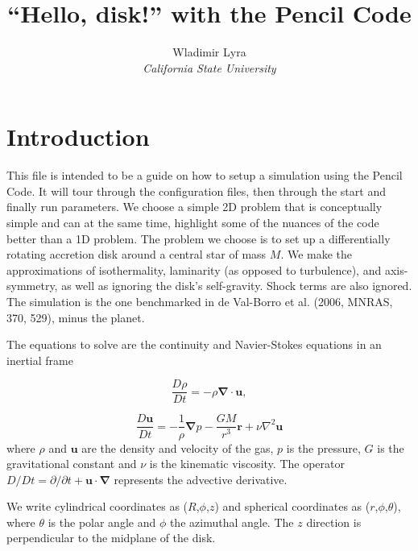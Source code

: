 \documentclass[a4paper,10pt]{article}
\newcommand{\pencilcode}{{\sc Pencil Code}}
\newcommand{\aderiv}[1]{\frac{D #1}{Dt}}
\renewcommand{\v}[1]{{\boldsymbol #1}} %
\newcommand{\del}{\v{\nabla}}
\newcommand{\grad}{\del}
\newcommand{\Div}{\v{\nabla}\cdot}
\newcommand{\Laplace}{\nabla^2}
\begin{document}
\date{}


\title{{\bf ``Hello, disk!'' with the \pencilcode}}


\author{Wladimir Lyra\\
{\it California State University}}               
\date{}  

\maketitle


\section{Introduction}

This file is intended to be a guide on how to setup a simulation using
the \pencilcode. It will tour through the configuration files, then
through the start and finally run parameters. We choose a simple 2D
problem that is conceptually simple and can at the same time,
highlight some of the nuances of the code better than a 1D
problem. The problem we choose is to set up a differentially rotating
accretion disk around a central star of mass $M$. We make the
approximations of isothermality, laminarity (as opposed to
turbulence), and axis-symmetry, as well as ignoring the disk's
self-gravity. Shock terms are also ignored. The simulation is the one
benchmarked in de Val-Borro et al. (2006, MNRAS, 370, 529), minus the planet. 

The equations to solve are the continuity and Navier-Stokes equations in an inertial frame

\begin{equation}
\label{continuity}
  \aderiv{\rho} = -\rho{\Div\v{u}}, 
\end{equation}

\begin{equation}
\label{navier-stokes}
  \aderiv{\v{u}} = -\frac{1}{\rho}\grad{p} - \frac{GM}{r^3}\v{r} + \nu\Laplace{\v{u}}
\end{equation}where $\rho$ and $\v{u}$ are the density and velocity of the gas, $p$ is the pressure, $G$ is the gravitational constant and $\nu$ is the kinematic viscosity. The operator ${D}/Dt = \partial /{\partial}t + \v{u}\cdot\del$ represents the advective derivative.

We write cylindrical coordinates as ($R$,$\phi$,$z$) and spherical coordinates as ($r$,$\phi$,$\theta$), where $\theta$ is the polar angle and $\phi$ the azimuthal angle. The $z$ direction is perpendicular to the midplane of the disk.
\end{document}

